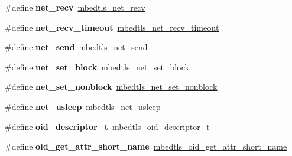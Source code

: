 \begin{DoxyCompactItemize}
\item 
\mbox{\label{compat-1_83_8h_adf9d9d0596a9a3dbdd5e0ed56be6bdf4}} 
\#define {\bfseries net\+\_\+recv}~\mbox{\hyperlink{net__sockets_8h_a03af351ec420bbeb5e91357abcfb3663}{mbedtls\+\_\+net\+\_\+recv}}
\item 
\mbox{\label{compat-1_83_8h_a5ed9f108a438956d9916ba9dfa57f815}} 
\#define {\bfseries net\+\_\+recv\+\_\+timeout}~\mbox{\hyperlink{net__sockets_8h_a67810154d2328a80b146155d8cdecfd9}{mbedtls\+\_\+net\+\_\+recv\+\_\+timeout}}
\item 
\mbox{\label{compat-1_83_8h_ac6979c72f99aeaad801274445ead1f89}} 
\#define {\bfseries net\+\_\+send}~\mbox{\hyperlink{net__sockets_8h_a4841afd0e14f1fd44b82c3a850961ab7}{mbedtls\+\_\+net\+\_\+send}}
\item 
\mbox{\label{compat-1_83_8h_a73a9edd9798a8ebd7e2feb0e560e0546}} 
\#define {\bfseries net\+\_\+set\+\_\+block}~\mbox{\hyperlink{net__sockets_8h_aeea4e6fd5ad3167bf8563e61f6f75963}{mbedtls\+\_\+net\+\_\+set\+\_\+block}}
\item 
\mbox{\label{compat-1_83_8h_a05582aae7758b9d82e715a75882e17ea}} 
\#define {\bfseries net\+\_\+set\+\_\+nonblock}~\mbox{\hyperlink{net__sockets_8h_a2ee4acdc24ef78c9acf5068a423b8c30}{mbedtls\+\_\+net\+\_\+set\+\_\+nonblock}}
\item 
\mbox{\label{compat-1_83_8h_abbd3294c37e3a0d6cbbf1e9b7e975a41}} 
\#define {\bfseries net\+\_\+usleep}~\mbox{\hyperlink{net__sockets_8h_a716044d3c30c449bd68052b7c418ff84}{mbedtls\+\_\+net\+\_\+usleep}}
\item 
\mbox{\label{compat-1_83_8h_a6fdb3c04436296c3fb434cae2ecc5d37}} 
\#define {\bfseries oid\+\_\+descriptor\+\_\+t}~\mbox{\hyperlink{structmbedtls__oid__descriptor__t}{mbedtls\+\_\+oid\+\_\+descriptor\+\_\+t}}
\item 
\mbox{\label{compat-1_83_8h_a5cdc4a4016526658e6f7d010318d70d1}} 
\#define {\bfseries oid\+\_\+get\+\_\+attr\+\_\+short\+\_\+name}~\mbox{\hyperlink{oid_8h_a027b5bb24a69578666631ffea74064a1}{mbedtls\+\_\+oid\+\_\+get\+\_\+attr\+\_\+short\+\_\+name}}
\item 

\end{DoxyCompactItemize}
